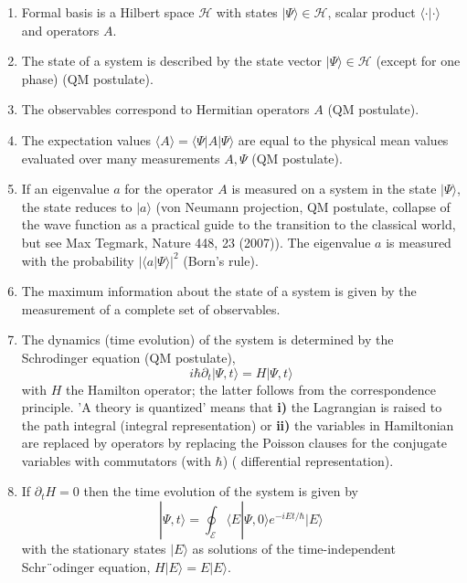 \begin{enumerate}
    \item Formal basis is a Hilbert space $\mathcal{H} $ with states $|\Psi\rangle\in\mathcal{H}$, scalar product $\langle\cdot|\cdot\rangle$ and operators $A$.
    \item The state of a system is described by the state vector $|\Psi\rangle\in\mathcal{H}$ (except for one phase) (QM postulate).
    \item The observables correspond to Hermitian operators $A$ (QM postulate).
    \item The expectation values $\langle A\rangle=\langle\Psi| A|\Psi\rangle$ are equal to the physical mean values ​​evaluated over many measurements {$A,\Psi$} (QM postulate).
    \item If an eigenvalue $a$ for the operator $A$ is measured on a system in the state $|\Psi\rangle$, the state reduces to $| a\rangle$ (von Neumann projection, QM postulate, collapse of the wave function as a practical guide to the transition to the classical world, but see Max Tegmark, Nature 448, 23 (2007)). The eigenvalue $a$ is measured with the probability $|\langle a|\Psi\rangle|^2$ (Born's rule).
    \item The maximum information about the state of a system is given by the measurement of a complete set of observables.
    \item The dynamics (time evolution) of the system is determined by the Schrodinger equation (QM postulate),
    \begin{equation}
        i \hbar \partial_{t}|\Psi, t\rangle= H|\Psi, t\rangle
        \end{equation}
    with $H$ the Hamilton operator; the latter follows from the correspondence principle. 'A theory is quantized' means that \textbf{i)} the Lagrangian is raised to the path integral (integral representation) or \textbf{ii)} the variables in Hamiltonian are replaced by operators by replacing the Poisson clauses for the conjugate variables with commutators (with $\hbar$) ( differential representation).
    \item If $\partial_tH=0$ then the time evolution of the system is given by
    \begin{equation}
        |\Psi, t\rangle=\oint_{\mathcal{E}}\langle E | \Psi, 0\rangle e^{-i E t / \hbar}|E\rangle
        \end{equation}
    with the stationary states $| E\rangle$ as solutions of the time-independent Schr¨odinger equation, $H| E\rangle=E| E\rangle$.

\end{enumerate}
